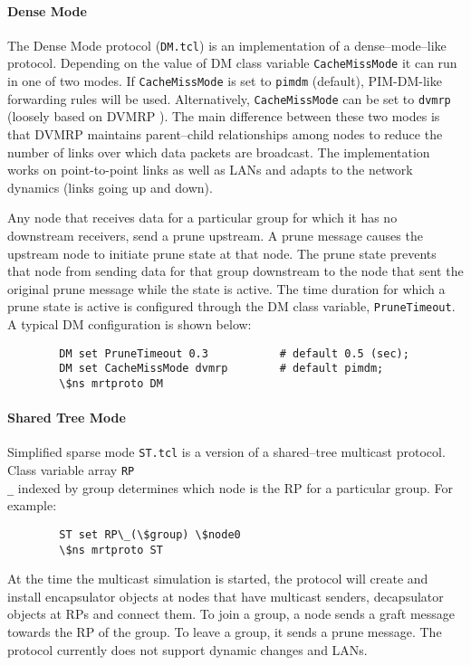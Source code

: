 \paragraph{Dense Mode}
The Dense Mode protocol ({\tt DM.tcl}) is an implementation of a
dense--mode--like protocol.  Depending on the value of DM class
variable {\tt CacheMissMode} it can run in one of two modes.  If
{\tt CacheMissMode} is set to {\tt pimdm} (default), PIM-DM-like
forwarding rules will be used.  Alternatively, {\tt CacheMissMode}
can be set to {\tt dvmrp} (loosely based on DVMRP \cite{rfc1075}).
The main difference between these two modes is that DVMRP maintains
parent--child relationships among nodes to reduce the number of links
over which data packets are broadcast.  The implementation works on
point-to-point links as well as LANs and adapts to the network
dynamics (links going up and down).

Any node that receives data for a particular group for which it has no
downstream receivers, send a prune upstream.  A prune message causes
the upstream node to initiate prune state at that node.  The prune
state prevents that node from sending data for that group downstream
to the node that sent the original prune message while the state is
active.  The time duration for which a prune state is active is
configured through the DM class variable, {\tt PruneTimeout}.  A
typical DM configuration is shown below:
\begin{verbatim}
        DM set PruneTimeout 0.3           # default 0.5 (sec);
        DM set CacheMissMode dvmrp        # default pimdm;
        \$ns mrtproto DM
\end{verbatim} %

\paragraph{Shared Tree Mode}
Simplified sparse mode {\tt ST.tcl} is a version of a shared--tree
multicast protocol.  Class variable array {\tt RP\\_} indexed by group
determines which node is the RP for a particular group.  For example:
\begin{verbatim}
        ST set RP\_(\$group) \$node0
        \$ns mrtproto ST
\end{verbatim}
At the time the multicast simulation is started, the protocol will
create and install encapsulator objects at nodes that have multicast
senders, decapsulator objects at RPs and connect them.  To join a
group, a node sends a graft message towards the RP of the group.  To
leave a group, it sends a prune message.  The protocol currently does
not support dynamic changes and LANs.

